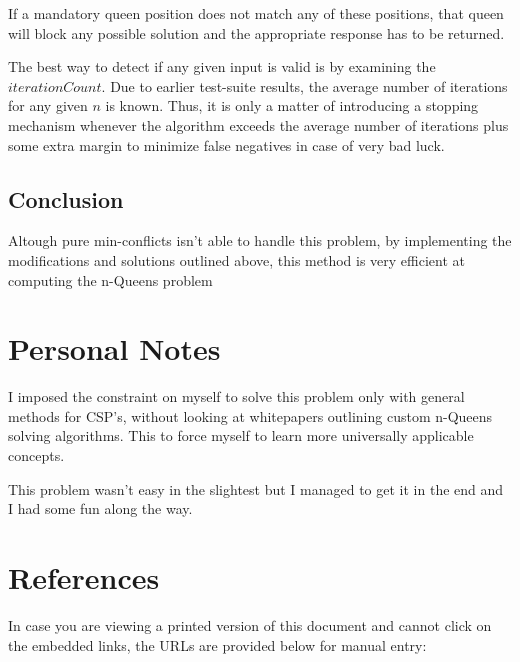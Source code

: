 \documentclass{article}
\begin{document}
If a mandatory queen position does not match any of these positions, that queen will block any possible solution and the appropriate response has to be returned.

The best way to detect if any given input is valid is by examining the \(iterationCount\).
Due to earlier test-suite results, the average number of iterations for any given \(n\) is known.
Thus, it is only a matter of introducing a stopping mechanism whenever the algorithm exceeds the average number of iterations
plus some extra margin to minimize false negatives in case of very bad luck.

\subsection{Conclusion}
Altough pure min-conflicts isn't able to handle this problem, by implementing the modifications and solutions outlined above,
this method is very efficient at computing the n-Queens problem

\section{Personal Notes}
I imposed the constraint on myself to solve this problem only with general methods for CSP's,
without looking at whitepapers outlining custom n-Queens solving algorithms. This to force
myself to learn more universally applicable concepts.

This problem wasn't easy in the slightest but I managed to get it in the end and I had some fun along the way.

\section*{References}
In case you are viewing a printed version of this document and cannot click on the embedded links, the URLs are provided below for manual entry:
\end{document}
